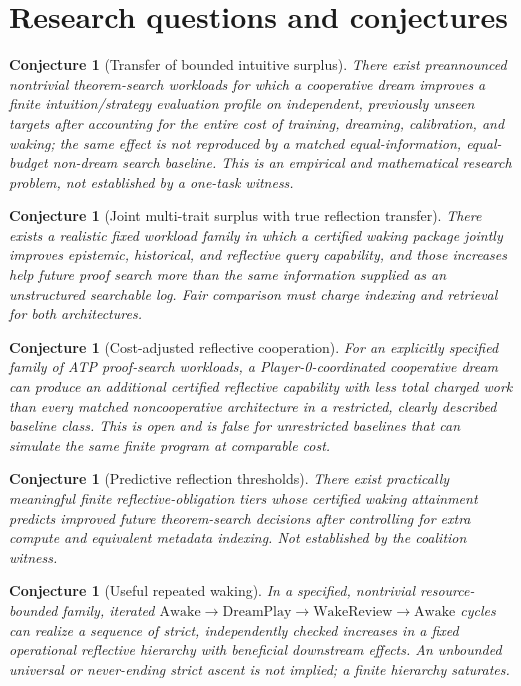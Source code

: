 \documentclass[11pt,letterpaper]{article}
\theoremstyle{definition}
\theoremstyle{plain}
\newtheorem{conjecture}[definition]{Conjecture}
\theoremstyle{definition}
\begin{document}
\section{Research questions and conjectures}\label{gl-first-W0-s17}
\begin{conjecture}[Transfer of bounded intuitive surplus]
There exist preannounced nontrivial theorem-search workloads for which a cooperative dream improves a finite intuition/strategy evaluation profile on independent, previously unseen targets after accounting for the entire cost of training, dreaming, calibration, and waking; the same effect is not reproduced by a matched equal-information, equal-budget non-dream search baseline. This is an empirical and mathematical research problem, not established by a one-task witness.
\end{conjecture}

\begin{conjecture}[Joint multi-trait surplus with true reflection transfer]
There exists a realistic fixed workload family in which a certified waking package jointly improves epistemic, historical, and reflective query capability, and those increases help future proof search more than the same information supplied as an unstructured searchable log. Fair comparison must charge indexing and retrieval for both architectures.
\end{conjecture}

\begin{conjecture}[Cost-adjusted reflective cooperation]
For an explicitly specified family of ATP proof-search workloads, a Player-0-coordinated cooperative dream can produce an additional certified reflective capability with \emph{less total charged work} than every matched noncooperative architecture in a restricted, clearly described baseline class. This is open and is false for unrestricted baselines that can simulate the same finite program at comparable cost.
\end{conjecture}

\begin{conjecture}[Predictive reflection thresholds]
There exist practically meaningful finite reflective-obligation tiers whose certified waking attainment predicts improved future theorem-search decisions after controlling for extra compute and equivalent metadata indexing. Not established by the coalition witness.
\end{conjecture}

\begin{conjecture}[Useful repeated waking]
In a specified, nontrivial resource-bounded family, iterated \(\mathrm{Awake}\to\mathrm{DreamPlay}\to\mathrm{WakeReview}\to\mathrm{Awake}\) cycles can realize a sequence of strict, independently checked increases in a fixed operational reflective hierarchy with beneficial downstream effects. An unbounded universal or never-ending strict ascent is not implied; a finite hierarchy saturates.
\end{conjecture}
\end{document}
